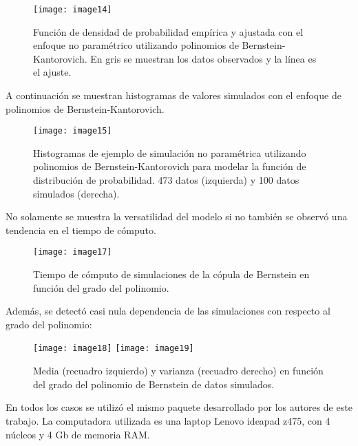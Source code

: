 \begin{figure}
	\centering
\texttt{[image: image14]}
	\caption{Funci\'on de densidad de probabilidad emp\'irica y ajustada con el enfoque no param\'etrico utilizando polinomios de Bernstein-Kantorovich. En gris se muestran los datos observados y la l\'inea es el ajuste.}
	\label{f:gijonCDF}
\end{figure}

A continuaci\'on se muestran histogramas de valores simulados con el enfoque de polinomios de Bernstein-Kantorovich.

\begin{figure}
	\centering
\texttt{[image: image15]}
	\caption{Histogramas de ejemplo de simulaci\'on no param\'etrica utilizando polinomios de Bernstein-Kantorovich para modelar la funci\'on de distribuci\'on de probabilidad. 473 datos (izquierda) y 100 datos
simulados (derecha).}
	\label{f:histBerns}
\end{figure}

No solamente se muestra la versatilidad del modelo si no tambi\'en se observ\'o una tendencia en el tiempo de c\'omputo.

\begin{figure}
	\centering
	\texttt{[image: image17]}
\caption{Tiempo de c\'omputo de simulaciones de la c\'opula de Bernstein en funci\'on del grado del polinomio.}
	\label{f:bernsPolyTime}
\end{figure}

Adem\'as, se detect\'o casi nula dependencia de las simulaciones con respecto al grado del polinomio:

\begin{figure}[H]
	\centering
\texttt{[image: image18]}
\texttt{[image: image19]}
	\caption{Media (recuadro izquierdo) y varianza (recuadro derecho) en funci\'on del grado del polinomio de Bernstein de datos simulados.}
	\label{f:bernsPolyError}
\end{figure}

En todos los casos se utiliz\'o el mismo paquete desarrollado por los autores de este trabajo. La computadora utilizada es una laptop Lenovo ideapad z475, con 4 n\'ucleos y 4 Gb de memoria RAM.

